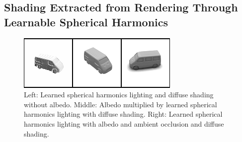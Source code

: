 \documentclass[10pt,twocolumn,letterpaper]{article}
\begin{document}
\subsection{Shading Extracted from Rendering Through Learnable Spherical Harmonics}\label{sec:learned_sh}
\begin{figure}[h!]
\centering
\includegraphics[width=1.0\columnwidth]{./assets/sh-comp-onerow.png}
\caption{Left: Learned spherical harmonics lighting and diffuse shading without albedo. Middle: Albedo multiplied by learned spherical harmonics lighting with diffuse shading. Right: Learned spherical harmonics lighting with albedo and ambient occlusion and diffuse shading.}
\label{fig:SHComparison}
\end{figure}
\end{document}
